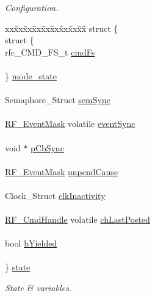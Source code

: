\begin{DoxyCompactItemize}
\begin{tabbing}
\end{tabbing}\begin{DoxyCompactList}\small\item\em Configuration. \end{DoxyCompactList}\item 
\begin{tabbing}
xx\=xx\=xx\=xx\=xx\=xx\=xx\=xx\=xx\=\kill
struct \{\\
\>struct \{\\
\>\>rfc\_CMD\_FS\_t \hyperlink{struct_r_f___object_a48d422eefb97146c830e9b21970bc3a6}{cmdFs}\\
\>\>\\
\>\} \hyperlink{struct_r_f___object_a8201edc4d31d994d0218da2e8a0fcd5b}{mode\_state}\\
\>\>\\
\>Semaphore\_Struct \hyperlink{struct_r_f___object_a2282dfef5c2e04522edfb61f9152628b}{semSync}\\
\>\>\\
\>\hyperlink{_r_f_8h_a128c46e18dbbaa781abb7abafc35233a}{RF\_EventMask} volatile \hyperlink{struct_r_f___object_a8379964e73b8969eb45fe49773eba235}{eventSync}\\
\>\>\\
\>void $\ast$ \hyperlink{struct_r_f___object_ae3219bcfb65bacac26d30af83415863b}{pCbSync}\\
\>\>\\
\>\hyperlink{_r_f_8h_a128c46e18dbbaa781abb7abafc35233a}{RF\_EventMask} \hyperlink{struct_r_f___object_a41528750208c1e201b276509396e0a30}{unpendCause}\\
\>\>\\
\>Clock\_Struct \hyperlink{struct_r_f___object_aaa9b100fc07809bd9086ffc44ebd4225}{clkInactivity}\\
\>\>\\
\>\hyperlink{_r_f_8h_acab1f56c62a9fd1ad0a91a46b6da23f1}{RF\_CmdHandle} volatile \hyperlink{struct_r_f___object_a855d6435f6532e99b2e6d6e1675212ca}{chLastPosted}\\
\>\>\\
\>bool \hyperlink{struct_r_f___object_a0b8d281afbb2a67d5b238b30fa1f8849}{bYielded}\\
\>\>\\
\} \hyperlink{struct_r_f___object_a2690b9a688416515bafa40617e266c89}{state}\\

\end{tabbing}\begin{DoxyCompactList}\small\item\em State \& variables. \end{DoxyCompactList}\end{DoxyCompactItemize}


